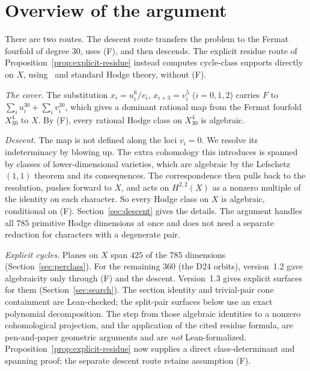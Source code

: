 \documentclass[11pt]{amsart}
\theoremstyle{remark}\newtheorem{remark}[theorem]{Remark}
\begin{document}
\section{Overview of the argument}
There are two routes. The descent route transfers the problem to the Fermat fourfold of degree $30$, uses (F), and then descends. The explicit residue route of Proposition~\ref{prop:explicit-residue} instead computes cycle-class supports directly on $X$, using~\cite{VL} and standard Hodge theory, without (F).

\emph{The cover.} The substitution $x_i=u_i^6/v_i$, $x_{i+3}=v_i^5$ ($i=0,1,2$) carries $F$ to
$\sum_i u_i^{30}+\sum_i v_i^{30}$, which gives a dominant rational map from the Fermat fourfold
$X^4_{30}$ to $X$. By (F), every rational Hodge class on $X^4_{30}$ is algebraic.

\emph{Descent.} The map is not defined along the loci $v_i=0$. We resolve its indeterminacy by
blowing up. The extra cohomology this introduces is spanned by classes of
lower-dimensional varieties, which are algebraic by the Lefschetz $(1,1)$ theorem and its consequences. The
correspondence then pulls back to the resolution, pushes forward to $X$, and acts on $H^{2,2}(X)$ as a nonzero
multiple of the identity on each character. So every Hodge class on $X$ is algebraic, conditional
on (F). Section~\ref{sec:descent} gives the details. The argument handles all $785$ primitive Hodge
dimensions at once and does not need a separate reduction for characters with a degenerate pair.

\emph{Explicit cycles.} Planes on $X$ span $425$ of the $785$ dimensions
(Section~\ref{sec:perclass}). For the remaining $360$ (the D24 orbits), version~1.2 gave algebraicity only
through (F) and the descent. Version~1.3 gives explicit surfaces for them
(Section~\ref{sec:search}). The section identity and trivial-pair cone containment are Lean-checked; the split-pair surfaces below use an exact polynomial decomposition. The step from those algebraic identities to a nonzero cohomological projection, and the application of the cited residue formula, are pen-and-paper geometric arguments and are \emph{not} Lean-formalized. Proposition~\ref{prop:explicit-residue} now supplies a direct class-determinant and spanning proof; the separate descent route retains assumption (F).
\end{document}
